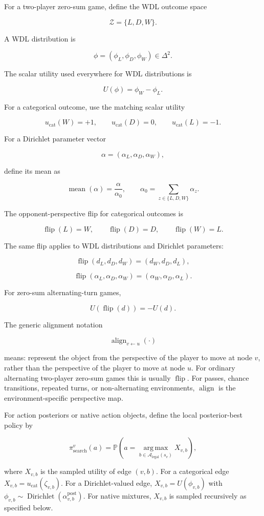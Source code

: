 \documentclass[11pt]{article}
\newcommand{\Prob}{\mathbb{P}}
\newcommand{\Dir}{\operatorname{Dirichlet}}
\newcommand{\argmax}{\operatorname*{arg\,max}}
\newcommand{\mean}{\operatorname{mean}}
\newcommand{\Legal}{\mathcal{A}_{\mathrm{legal}}}
\newcommand{\Z}{\mathcal{Z}}
\newcommand{\Flip}{\operatorname{flip}}
\newcommand{\Align}{\operatorname{align}}
\newcommand{\Utility}{U}
\newcommand{\OutcomeUtility}{u_{\mathrm{cat}}}
\begin{document}
For a two-player zero-sum game, define the WDL outcome space

\[
\Z = \{L,D,W\}.
\]

A WDL distribution is

\[
\phi = (\phi_L,\phi_D,\phi_W) \in \Delta^2.
\]

The scalar utility used everywhere for WDL distributions is

\[
\Utility(\phi) = \phi_W - \phi_L.
\]

For a categorical outcome, use the matching scalar utility

\[
\OutcomeUtility(W)=+1,
\qquad
\OutcomeUtility(D)=0,
\qquad
\OutcomeUtility(L)=-1.
\]

For a Dirichlet parameter vector

\[
\alpha = (\alpha_L,\alpha_D,\alpha_W),
\]

define its mean as

\[
\mean(\alpha)
=
\frac{\alpha}{\alpha_0},
\qquad
\alpha_0 = \sum_{z \in \{L,D,W\}} \alpha_z.
\]

The opponent-perspective flip for categorical outcomes is

\[
\Flip(L)=W,
\qquad
\Flip(D)=D,
\qquad
\Flip(W)=L.
\]

The same flip applies to WDL distributions and Dirichlet parameters:

\[
\Flip(d_L,d_D,d_W)
=
(d_W,d_D,d_L),
\]

\[
\Flip(\alpha_L,\alpha_D,\alpha_W)
=
(\alpha_W,\alpha_D,\alpha_L).
\]

For zero-sum alternating-turn games,

\[
\Utility(\Flip(d)) = -\Utility(d).
\]

The generic alignment notation

\[
\Align_{v\leftarrow u}(\cdot)
\]

means: represent the object from the perspective of the player to move at node
\(v\), rather than the perspective of the player to move at node \(u\). For
ordinary alternating two-player zero-sum games this is usually \(\Flip\). For
passes, chance transitions, repeated turns, or non-alternating environments,
\(\Align\) is the environment-specific perspective map.

For action posteriors or native action objects, define the local posterior-best
policy by

\[
\pi_{\mathrm{search}}^v(a)
=
\Prob
\left(
  a=
  \argmax_{b\in\Legal(s_v)}
  X_{v,b}
\right),
\]

where \(X_{v,b}\) is the sampled utility of edge \((v,b)\). For a categorical
edge \(X_{v,b}=\OutcomeUtility(\zeta_{v,b})\). For a Dirichlet-valued edge,
\(X_{v,b}=\Utility(\phi_{v,b})\) with
\(\phi_{v,b}\sim\Dir(\alpha^{\mathrm{post}}_{v,b})\). For native mixtures,
\(X_{v,b}\) is sampled recursively as specified below.
\end{document}
